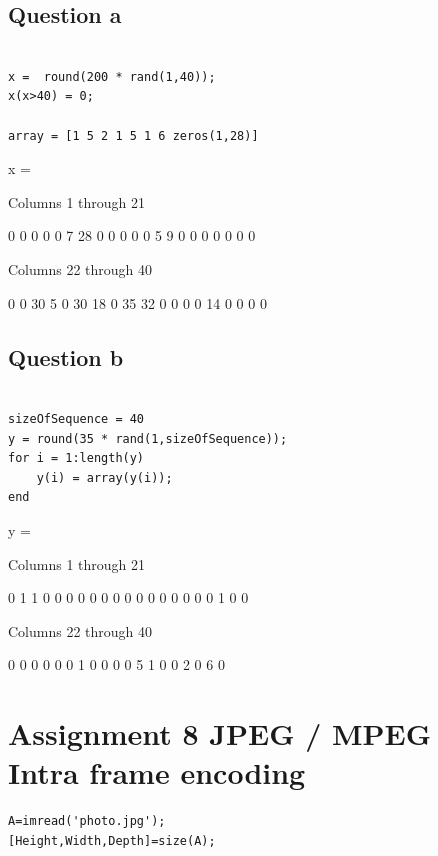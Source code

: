 \documentclass[titlepage]{article}
\begin{document}
\subsection{Question a}
\label{sec:org75669b4}
\begin{verbatim}

x =  round(200 * rand(1,40));
x(x>40) = 0;

array = [1 5 2 1 5 1 6 zeros(1,28)]
\end{verbatim}


x =

Columns 1 through 21

0     0     0     0     0     7    28     0     0     0     0     0     5     9     0     0     0     0     0     0     0

Columns 22 through 40

0     0    30     5     0    30    18     0    35    32     0     0     0     0    14     0     0     0     0

\subsection{Question b}
\label{sec:org24b29b9}
\begin{verbatim}

sizeOfSequence = 40
y = round(35 * rand(1,sizeOfSequence));
for i = 1:length(y)
    y(i) = array(y(i));
end

\end{verbatim}

y =

Columns 1 through 21

0     1     1     0     0     0     0     0     0     0     0     0     0     0     0     0     0     0     1     0     0

Columns 22 through 40

0     0     0     0     0     0     1     0     0     0     0     5     1     0     0     2     0     6     0


\section{Assignment 8 JPEG / MPEG Intra frame encoding}
\label{sec:org1933cc4}

\begin{verbatim}
A=imread('photo.jpg');
[Height,Width,Depth]=size(A);
\end{verbatim}
\end{document}
